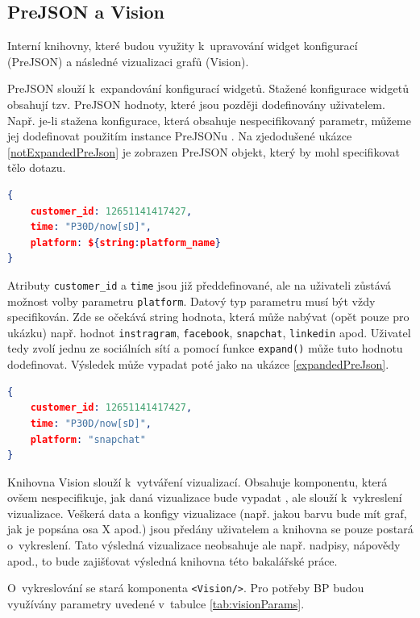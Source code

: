 \documentclass[czech, bc, kiv, he, iso690numb, viewonly]{fasthesis} %
\begin{document}
\subsection{PreJSON a Vision}

Interní knihovny, které budou využity k~upravování widget konfigurací (PreJSON) a následné vizualizaci grafů (Vision).

PreJSON slouží k~expandování konfigurací widgetů. Stažené konfigurace widgetů obsahují tzv. PreJSON hodnoty, které jsou později dodefinovány uživatelem. Např. je-li stažena konfigurace, která obsahuje
nespecifikovaný parametr, můžeme jej dodefinovat použitím instance PreJSONu \cite{preJSONDocs}. Na zjedodušené ukázce \ref{notExpandedPreJson} je zobrazen PreJSON objekt, který by mohl specifikovat tělo dotazu. 

\begin{lstlisting}[language=json, caption={Neexpandovaný PreJSON objekt}, label=notExpandedPreJson]
{
	customer_id: 12651141417427,
	time: "P30D/now[sD]",
	platform: ${string:platform_name}
}
\end{lstlisting}
		
Atributy \texttt{customer\_id} a \texttt{time} jsou již předdefinované, ale na uživateli zůstává možnost volby parametru \texttt{platform}. Datový typ parametru musí být vždy specifikován.
Zde se očekává string hodnota, která může nabývat (opět pouze pro ukázku) např. hodnot \texttt{instragram}, \texttt{facebook}, \texttt{snapchat}, \texttt{linkedin} apod. Uživatel tedy zvolí jednu ze sociálních sítí
a pomocí funkce \texttt{expand()} může tuto hodnotu dodefinovat. Výsledek může vypadat poté jako na ukázce \ref{expandedPreJson}.

\begin{lstlisting}[language=json, caption={Expandovaný PreJSON objekt}, label=expandedPreJson]
{
	customer_id: 12651141417427,
	time: "P30D/now[sD]",
	platform: "snapchat"
}
\end{lstlisting}

Knihovna Vision slouží k~vytváření vizualizací. Obsahuje komponentu, která ovšem nespecifikuje, jak daná vizualizace bude vypadat \cite{visionDocs}, ale slouží k~vykreslení vizualizace. 
Veškerá data a konfigy vizualizace (např. jakou barvu bude mít graf, jak je popsána osa X apod.) jsou předány uživatelem a knihovna se pouze postará o~vykreslení. Tato výsledná vizualizace 
neobsahuje ale např. nadpisy, nápovědy apod., to bude zajišťovat výsledná knihovna této bakalářské práce.

O~vykreslování se stará komponenta \texttt{<Vision/>}. Pro potřeby BP budou využívány parametry uvedené v~tabulce \ref{tab:visionParams}.
\end{document}
